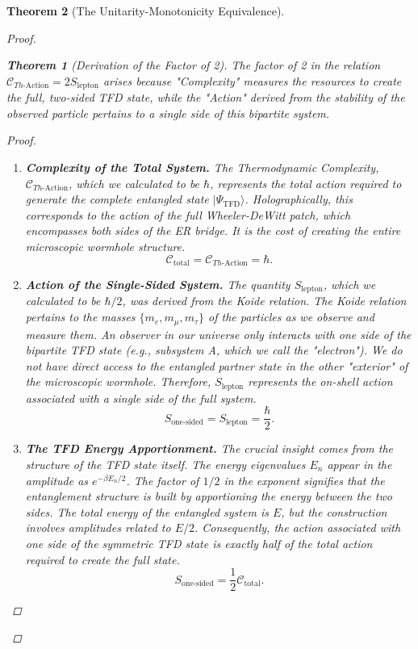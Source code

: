 \documentclass[11pt, letterpaper]{report}
\theoremstyle{plain} %
\newtheorem{theorem}{Theorem}[chapter]
\theoremstyle{definition} %
\theoremstyle{remark} %
\begin{document}
\begin{theorem}[The Unitarity-Monotonicity Equivalence]
\begin{proof}
\begin{theorem}[Derivation of the Factor of 2]
The factor of 2 in the relation $\mathcal{C}_{Th\text{-Action}} = 2 S_{\text{lepton}}$ arises because "Complexity" measures the resources to create the full, two-sided TFD state, while the "Action" derived from the stability of the observed particle pertains to a single side of this bipartite system.
\end{theorem}
\begin{proof}
\begin{enumerate}
    \item \textbf{Complexity of the Total System.} The Thermodynamic Complexity, $\mathcal{C}_{Th\text{-Action}}$, which we calculated to be $\hbar$, represents the total action required to generate the complete entangled state $|\Psi_{\text{TFD}}\rangle$. Holographically, this corresponds to the action of the full Wheeler-DeWitt patch, which encompasses both sides of the ER bridge. It is the cost of creating the entire microscopic wormhole structure.
    \begin{equation}
        \mathcal{C}_{\text{total}} = \mathcal{C}_{Th\text{-Action}} = \hbar.
    \end{equation}

    \item \textbf{Action of the Single-Sided System.} The quantity $S_{\text{lepton}}$, which we calculated to be $\hbar/2$, was derived from the Koide relation. The Koide relation pertains to the masses $\{m_e, m_\mu, m_\tau\}$ of the particles as we observe and measure them. An observer in our universe only interacts with one side of the bipartite TFD state (e.g., subsystem A, which we call the "electron"). We do not have direct access to the entangled partner state in the other "exterior" of the microscopic wormhole. Therefore, $S_{\text{lepton}}$ represents the on-shell action associated with a single side of the full system.
    \begin{equation}
        S_{\text{one-sided}} = S_{\text{lepton}} = \frac{\hbar}{2}.
    \end{equation}
    
    \item \textbf{The TFD Energy Apportionment.} The crucial insight comes from the structure of the TFD state itself. The energy eigenvalues $E_n$ appear in the amplitude as $e^{-\beta E_n/2}$. The factor of $1/2$ in the exponent signifies that the entanglement structure is built by apportioning the energy between the two sides. The total energy of the entangled system is $E$, but the construction involves amplitudes related to $E/2$. Consequently, the action associated with one side of the symmetric TFD state is exactly half of the total action required to create the full state.
    \begin{equation}
        S_{\text{one-sided}} = \frac{1}{2} \mathcal{C}_{\text{total}}.
    \end{equation}


\end{enumerate}
\end{proof}
\end{proof}
\end{theorem}
\end{document}
